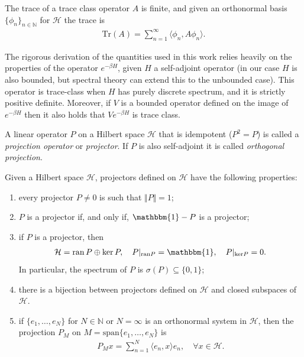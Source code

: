 \begin{appendices}
\begin{proposition}
	The trace of a trace class operator $A$ is finite, and given an orthonormal basis
	$\{\phi_n\}_{n\in\mathbb{N}}$ for $\mathcal{H}$ the trace is
	\begin{align*}
		\mathrm{Tr}(A) = \sum_{n=1}^\infty \langle\phi_n,A\phi_n\rangle.
	\end{align*}
\end{proposition}

\begin{remark}
	The rigorous derivation of the quantities used in this work relies heavily on the properties
	of the operator $e^{-\beta H}$, given $H$ a self-adjoint operator (in our case $H$ is also
	bounded, but spectral theory can extend this to the unbounded case).
	This operator is trace-class when $H$ has purely discrete spectrum, and it is strictly
	positive definite. Moreover, if $V$ is a bounded operator defined on the image of
	$e^{-\beta H}$ then it also holds that $Ve^{-\beta H}$ is trace class.
\end{remark}

\begin{definition}[Projection]
	A linear operator $P$ on a Hilbert space $\mathcal{H}$ that is idempotent ($P^2=P$) is
	called a \textit{projection operator} or \textit{projector}. If $P$ is also self-adjoint
	it is called \textit{orthogonal projection}.
\end{definition}
\begin{proposition}
	Given a Hilbert space $\mathcal{H}$, projectors defined on $\mathcal{H}$ have the following
	properties:
	\begin{enumerate}
		\item[a)] every projector $P\neq0$ is such that $\Vert P\Vert = 1$;
		\item[b)] $P$ is a projector if, and only if, $\mathbbm{1} - P$ is a projector;
		\item[c)] if $P$ is a projector, then
			\begin{align*}
				\mathcal{H} = \mathrm{ran}\, P \oplus \ker P,
				\quad P|_{\mathrm{ran}P} = \mathbbm{1},
				\quad P|_{\mathrm{ker}P} = 0.
			\end{align*}
			In particular, the spectrum of $P$ is $\sigma(P)\subseteq\{0,1\}$;
		\item[d)] there is a bijection between projectors defined on $\mathcal{H}$ and closed
			subspaces of $\mathcal{H}$.
		\item[e)] if $\{e_1,\ldots,e_N\}$ for $N\in\mathbb{N}$ or $N=\infty$ is an orthonormal
			system in $\mathcal{H}$, then the projection $P_M$ on $M=\mathrm{span}\{e_1,\ldots,e_N\}$ is
			\begin{align*}
				P_M x = \sum_{n=1}^N \langle e_n,x\rangle e_n,\quad\forall x\in\mathcal{H}.
			\end{align*}
	\end{enumerate}
\end{proposition}


\end{appendices}
